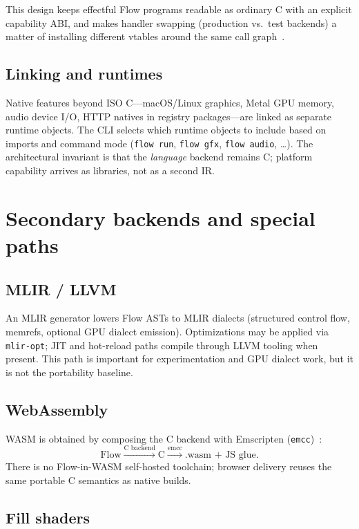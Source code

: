 \documentclass[11pt,a4paper]{article}
\theoremstyle{remark}
\begin{document}
This design keeps effectful Flow programs readable as ordinary C with an
explicit capability ABI, and makes handler swapping (production vs.\ test
backends) a matter of installing different vtables around the same call
graph~\cite{flow-effects}.

\subsection{Linking and runtimes}

Native features beyond ISO C---macOS/Linux graphics, Metal GPU memory, audio
device I/O, HTTP natives in registry packages---are linked as separate runtime
objects. The CLI selects which runtime objects to include based on imports and
command mode (\texttt{flow run}, \texttt{flow gfx}, \texttt{flow audio},
\ldots). The architectural invariant is that the \emph{language} backend remains
C; platform capability arrives as libraries, not as a second IR.

\section{Secondary backends and special paths}
\label{sec:secondary}

\subsection{MLIR / LLVM}

An MLIR generator lowers Flow ASTs to MLIR dialects (structured control flow,
memrefs, optional GPU dialect emission). Optimizations may be applied via
\texttt{mlir-opt}; JIT and hot-reload paths compile through LLVM tooling when
present. This path is important for experimentation and GPU dialect work, but
it is not the portability baseline.

\subsection{WebAssembly}

WASM is obtained by composing the C backend with Emscripten
(\texttt{emcc})~\cite{flow-wasm}:
\[
\text{Flow} \xrightarrow{\text{C backend}} \text{C}
  \xrightarrow{\text{emcc}} \text{.wasm + JS glue}.
\]
There is no Flow-in-WASM self-hosted toolchain; browser delivery reuses the
same portable C semantics as native builds.

\subsection{Fill shaders}
\end{document}
